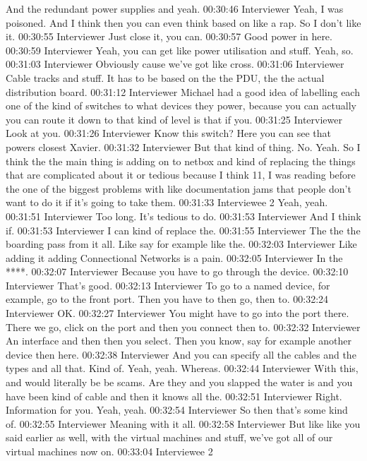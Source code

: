 And the redundant power supplies and yeah.
00:30:46 Interviewer
Yeah, I was poisoned. And I think then you can even think based on like a rap. So I don't like it.
00:30:55 Interviewer
Just close it, you can.
00:30:57
Good power in here.
00:30:59 Interviewer
Yeah, you can get like power utilisation and stuff. Yeah, so.
00:31:03 Interviewer
Obviously cause we've got like cross.
00:31:06 Interviewer
Cable tracks and stuff. It has to be based on the the PDU, the the actual distribution board.
00:31:12 Interviewer
Michael had a good idea of labelling each one of the kind of switches to what devices they power, because you can actually you can route it down to that kind of level is that if you.
00:31:25 Interviewer
Look at you.
00:31:26 Interviewer
Know this switch? Here you can see that powers closest Xavier.
00:31:32 Interviewer
But that kind of thing. No. Yeah. So I think the the main thing is adding on to netbox and kind of replacing the things that are complicated about it or tedious because I think 11, I was reading before the one of the biggest problems with like documentation jams that people don't want to do it if it's going to take them.
00:31:33 Interviewee 2 
Yeah, yeah.
00:31:51 Interviewer
Too long. It's tedious to do.
00:31:53 Interviewer
And I think if.
00:31:53 Interviewer
I can kind of replace the.
00:31:55 Interviewer
The the the boarding pass from it all. Like say for example like the.
00:32:03 Interviewer
Like adding it adding Connectional Networks is a pain.
00:32:05 Interviewer
In the ****.
00:32:07 Interviewer
Because you have to go through the device.
00:32:10 Interviewer
That's good.
00:32:13 Interviewer
To go to a named device, for example, go to the front port. Then you have to then go, then to.
00:32:24 Interviewer
OK.
00:32:27 Interviewer
You might have to go into the port there. There we go, click on the port and then you connect then to.
00:32:32 Interviewer
An interface and then then you select. Then you know, say for example another device then here.
00:32:38 Interviewer
And you can specify all the cables and the types and all that. Kind of. Yeah, yeah. Whereas.
00:32:44 Interviewer
With this, and would literally be be scams. Are they and you slapped the water is and you have been kind of cable and then it knows all the.
00:32:51 Interviewer
Right. Information for you. Yeah, yeah.
00:32:54 Interviewer
So then that's some kind of.
00:32:55 Interviewer
Meaning with it all.
00:32:58 Interviewer
But like like you said earlier as well, with the virtual machines and stuff, we've got all of our virtual machines now on.
00:33:04 Interviewee 2 
